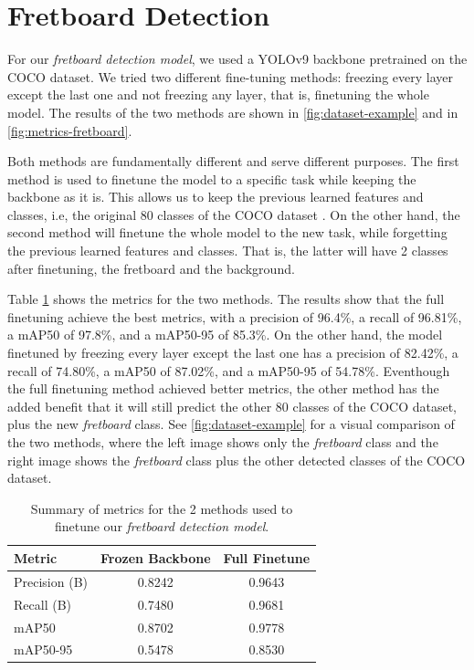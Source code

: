 \documentclass[10pt,twocolumn,letterpaper]{article}
\begin{document}
\section{Fretboard Detection}
For our \emph{fretboard detection model}, we used a YOLOv9 backbone \cite{wang2024yolov9} pretrained on the COCO dataset. We tried two different fine-tuning methods: freezing every layer except the last one and not freezing any layer, that is, finetuning the whole model. The results of the two methods are shown in \cref{fig:dataset-example} and in \cref{fig:metrics-fretboard}. 

Both methods are fundamentally different and serve different purposes. The first method is used to finetune the model to a specific task while keeping the backbone as it is. This allows us to keep the previous learned features and classes, i.e, the original 80 classes of the COCO dataset \cite{lin2015microsoftcococommonobjects}. On the other hand, the second method will finetune the whole model to the new task, while forgetting the previous learned features and classes. That is, the latter will have 2 classes after finetuning, the fretboard and the background.

Table \ref{tab:fretboard-metrics} shows the metrics for the two methods. The results show that the full finetuning achieve the best metrics, with a precision of 96.4\%, a recall of 96.81\%, a mAP50 of 97.8\%, and a mAP50-95 of 85.3\%. On the other hand, the model finetuned by freezing every layer except the last one has a precision of 82.42\%, a recall of 74.80\%, a mAP50 of 87.02\%, and a mAP50-95 of 54.78\%. Eventhough the full finetuning method achieved better metrics, the other method has the added benefit that it will still predict the other 80 classes of the COCO dataset, plus the new \emph{fretboard} class. See \cref{fig:dataset-example} for a visual comparison of the two methods, where the left image shows only the \emph{fretboard} class and the right image shows the \emph{fretboard} class plus the other detected classes of the COCO dataset.

\begin{table}[h!]
    \centering
    \caption{Summary of metrics for the 2 methods used to finetune our \emph{fretboard detection model}.}
    \begin{tabular}{lcc}
        \toprule
        \textbf{Metric} & \textbf{Frozen Backbone} & \textbf{Full Finetune} \\
        \midrule
        Precision (B)   & 0.8242 & 0.9643 \\
        Recall (B)      & 0.7480 & 0.9681 \\
        mAP50           & 0.8702 & 0.9778 \\
        mAP50-95        & 0.5478 & 0.8530 \\
        \bottomrule
    \end{tabular}
    \label{tab:fretboard-metrics}
\end{table}
\end{document}
